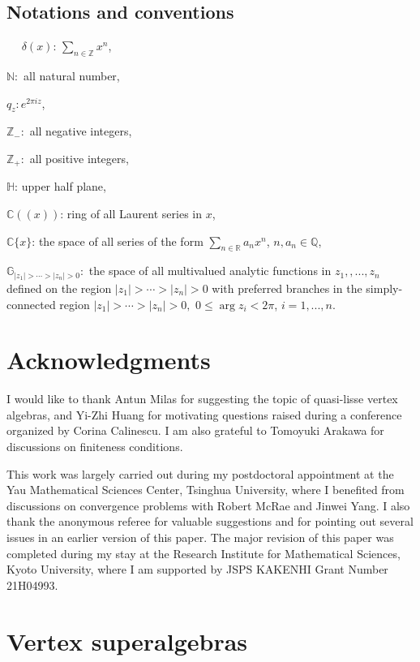 \documentclass[9pt]{amsart}
\newcommand{\Z}{\mathbb{Z}}      %
\begin{document}
\subsection{Notations and conventions}

$\quad$ $\delta(x)$: $\sum_{n\in \Z} x^n$,

$\mathbb{N}:$ all natural number,

$q_{z}:e^{2\pi i z}$,

$\mathbb{Z}_-:$ all negative integers,

$\mathbb{Z}_{+}:$ all positive integers,

$\mathbb{H}$: upper half plane,

$\mathbb{C}((x))$: ring of all Laurent series in $x$,

$\mathbb{C}\{x\}$: the space of all series of the form $\sum_{n\in \mathbb{R}}a_{n}x^{n}$, $n,a_n\in \mathbb{Q}$,

$\mathbb{G}_{|z_1|>\cdots>|z_n|>0}:$ the space of all multivalued analytic functions in $z_1,,...,z_n$ defined on the region $|z_1|>\cdots>|z_n|>0$ with preferred branches in the simply-connected region $|z_1|>\cdots >|z_n|>0,$ $0\leq \operatorname{arg}z_i<2\pi$, $i=1,...,n$.

\section*{Acknowledgments}

I would like to thank Antun Milas for suggesting the topic of quasi-lisse vertex algebras, and Yi-Zhi Huang for motivating questions raised during a conference organized by Corina Calinescu. I am also grateful to Tomoyuki Arakawa for discussions on finiteness conditions.  

This work was largely carried out during my postdoctoral appointment at the Yau Mathematical Sciences Center, Tsinghua University, where I benefited from discussions on convergence problems with Robert McRae and Jinwei Yang. I also thank the anonymous referee for valuable suggestions and for pointing out several issues in an earlier version of this paper. The major revision of this paper was completed during my stay at the Research Institute for Mathematical Sciences, Kyoto University, where I am supported by JSPS KAKENHI Grant Number 21H04993.

\section{Vertex superalgebras}\label{section1}
\end{document}
